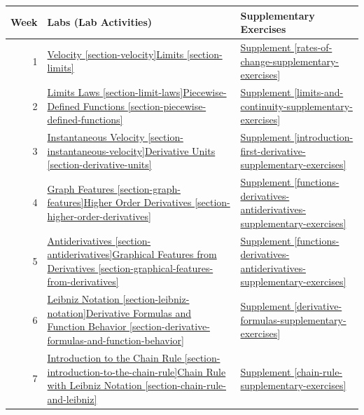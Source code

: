 \documentclass[10pt,oneside,]{book}
\theoremstyle{plain}
\theoremstyle{definition}
\numberwithin{equation}{section}
\begin{document}
\newline{}\begin{tabular}{rp{3in}p{1.1in}}
\toprule
Week&Labs (Lab Activities)&Supplementary Exercises\\
\midrule
1&\hyperref[section-velocity]{Velocity \ref{section-velocity}}\textendash{}\hyperref[section-limits]{Limits \ref{section-limits}}&\hyperref[rates-of-change-supplementary-exercises]{Supplement \ref{rates-of-change-supplementary-exercises}}\\
\midrule
2&\hyperref[section-limit-laws]{Limits Laws \ref{section-limit-laws}}\textendash{}\hyperref[section-piecewise-defined-functions]{Piecewise-Defined Functions \ref{section-piecewise-defined-functions}}&\hyperref[limits-and-continuity-supplementary-exercises]{Supplement \ref{limits-and-continuity-supplementary-exercises}}\\
\midrule
3&\hyperref[section-instantaneous-velocity]{Instantaneous Velocity \ref{section-instantaneous-velocity}}\textendash{}\hyperref[section-derivative-units]{Derivative Units \ref{section-derivative-units}}&\hyperref[introduction-first-derivative-supplementary-exercises]{Supplement \ref{introduction-first-derivative-supplementary-exercises}}\\
\midrule
4&\hyperref[section-graph-features]{Graph Features \ref{section-graph-features}}\textendash{}\hyperref[section-higher-order-derivatives]{Higher Order Derivatives \ref{section-higher-order-derivatives}}&\hyperref[functions-derivatives-antiderivatives-supplementary-exercises]{Supplement \ref{functions-derivatives-antiderivatives-supplementary-exercises}}\\
\midrule
5&\hyperref[section-antiderivatives]{Antiderivatives \ref{section-antiderivatives}}\textendash{}\hyperref[section-graphical-features-from-derivatives]{Graphical Features from Derivatives \ref{section-graphical-features-from-derivatives}}&\hyperref[functions-derivatives-antiderivatives-supplementary-exercises]{Supplement \ref{functions-derivatives-antiderivatives-supplementary-exercises}}\\
\midrule
6&\hyperref[section-leibniz-notation]{Leibniz Notation \ref{section-leibniz-notation}}\textendash{}\hyperref[section-derivative-formulas-and-function-behavior]{Derivative Formulas and Function Behavior \ref{section-derivative-formulas-and-function-behavior}}&\hyperref[derivative-formulas-supplementary-exercises]{Supplement \ref{derivative-formulas-supplementary-exercises}}\\
\midrule
7&\hyperref[section-introduction-to-the-chain-rule]{Introduction to the Chain Rule \ref{section-introduction-to-the-chain-rule}}\textendash{}\hyperref[section-chain-rule-and-leibniz]{Chain Rule with Leibniz Notation \ref{section-chain-rule-and-leibniz}}&\hyperref[chain-rule-supplementary-exercises]{Supplement \ref{chain-rule-supplementary-exercises}}\\

\end{tabular}
\end{document}

